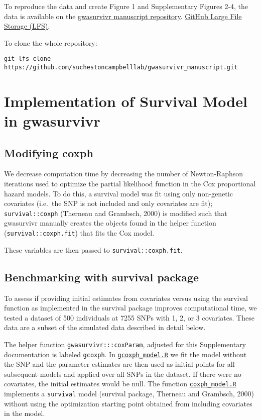 \documentclass[]{DissertateUSU}
\begin{document}
To reproduce the data and create Figure 1 and Supplementary Figures 2-4,
the data is available on the
\href{https://github.com/suchestoncampbelllab/gwasurvivr_manuscript}{gwasurvivr
manuscript repository}. \href{https://git-lfs.github.com/}{GitHub Large
File Storage (LFS)}.

To clone the whole repository:

\begin{verbatim}
git lfs clone https://github.com/suchestoncampbelllab/gwasurvivr_manuscript.git
\end{verbatim}

\section{Implementation of Survival Model in
gwasurvivr}\label{implementation-of-survival-model-in-gwasurvivr}

\subsection{Modifying coxph}\label{modifying-coxph}

We decrease computation time by decreasing the number of Newton-Raphson
iterations used to optimize the partial likelihood function in the Cox
proportional hazard models. To do this, a survival model was fit using
only non-genetic covariates (i.e.~the SNP is not included and only
covariates are fit); \texttt{survival::coxph} (Therneau and Grambsch,
2000) is modified such that gwasurvivr manually creates the objects
found in the helper function (\texttt{survival::coxph.fit}) that fits
the Cox model.

These variables are then passed to \texttt{survival::coxph.fit}.

\subsection{Benchmarking with survival
package}\label{benchmarking-with-survival-package}

To assess if providing initial estimates from covariates versus using
the survival function as implemented in the survival package improves
computational time, we tested a dataset of 500 individuals at 7255 SNPs
with 1, 2, or 3 covariates. These data are a subset of the simulated
data described in detail below.

The helper function \texttt{gwasurvivr:::coxParam}, adjusted for this
Supplementary documentation is labeled \texttt{gcoxph}. In
\href{https://github.com/suchestoncampbelllab/gwasurvivr_manuscript/blob/master/supplemental_data/code/gcoxph_model.R}{\texttt{gcoxph\_model.R}}
we fit the model without the SNP and the parameter estimates are then
used as initial points for all subsequent models and applied over all
SNPs in the dataset. If there were no covariates, the initial estimates
would be null. The function
\href{https://github.com/suchestoncampbelllab/gwasurvivr_manuscript/blob/master/supplemental_data/code/coxph_model.R}{\texttt{coxph\_model.R}}
implements a \texttt{survival} model (survival package, Therneau and
Grambsch, 2000) without using the optimization starting point obtained
from including covariates in the model.
\end{document}
